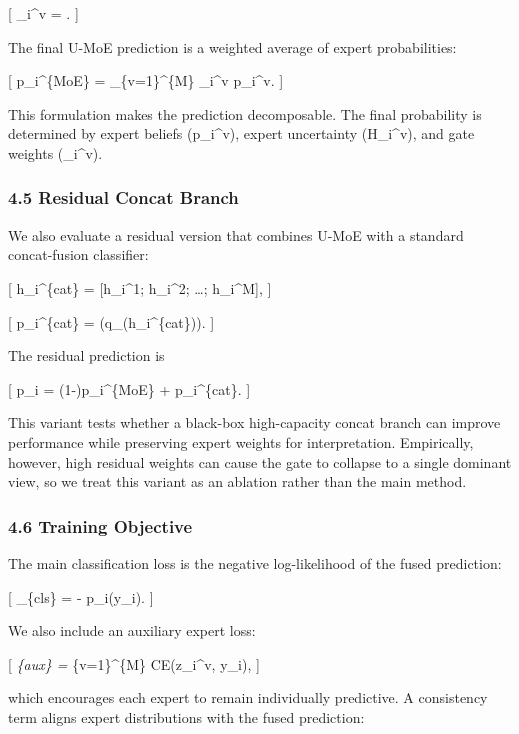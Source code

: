 \documentclass[
]{article}
\begin{document}
{[} \alpha\_i\^{}v = . {]}

The final U-MoE prediction is a weighted average of expert
probabilities:

{[} p\_i\^{}\{MoE\} = \sum\_\{v=1\}\^{}\{M\} \alpha\_i\^{}v p\_i\^{}v.
{]}

This formulation makes the prediction decomposable. The final
probability is determined by expert beliefs (p\_i\^{}v), expert
uncertainty (H\_i\^{}v), and gate weights (\alpha\_i\^{}v).

\subsubsection{4.5 Residual Concat Branch}\label{residual-concat-branch}

We also evaluate a residual version that combines U-MoE with a standard
concat-fusion classifier:

{[} h\_i\^{}\{cat\} = {[}h\_i\^{}1; h\_i\^{}2; \ldots; h\_i\^{}M{]}, {]}

{[} p\_i\^{}\{cat\} = (q\_\omega(h\_i\^{}\{cat\})). {]}

The residual prediction is

{[} p\_i = (1-\rho)p\_i\^{}\{MoE\} + \rho p\_i\^{}\{cat\}. {]}

This variant tests whether a black-box high-capacity concat branch can
improve performance while preserving expert weights for interpretation.
Empirically, however, high residual weights can cause the gate to
collapse to a single dominant view, so we treat this variant as an
ablation rather than the main method.

\subsubsection{4.6 Training Objective}\label{training-objective}

The main classification loss is the negative log-likelihood of the fused
prediction:

{[} \_\{cls\} = - \log p\_i(y\_i). {]}

We also include an auxiliary expert loss:

{[} \emph{\{aux\} = \sum}\{v=1\}\^{}\{M\}
CE(z\_i\^{}v, y\_i), {]}

which encourages each expert to remain individually predictive. A
consistency term aligns expert distributions with the fused prediction:
\end{document}
